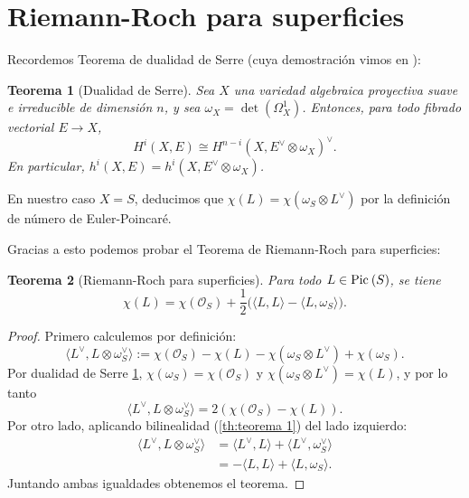 \documentclass[spanish,12pt]{amsart}
\newcommand{\Pic}[1]{\textup{Pic}{ \: (#1)}}
\newtheorem{theorem}{Teorema}[section]
\theoremstyle{definition}
\theoremstyle{remark}
\numberwithin{equation}{section}
\renewcommand{\O}{\mathcal{O}}
\begin{document}
\section{Riemann-Roch para superficies}

Recordemos Teorema de dualidad de Serre (cuya demostración vimos en \cite[Teorema 5.1.3]{notas_pedro}):

\begin{theorem}[Dualidad de Serre]\label{th:dualidad de serre}
Sea $X$ una variedad algebraica proyectiva suave e irreducible de dimensión $n$, y sea $\omega_X = \det (\Omega_X^1)$. Entonces, para todo fibrado vectorial $E \to X$,
\[
    H^i (X, E) \cong H^{n-i} (X, E^\vee \otimes \omega_X)^{\vee}.
\]
En particular, $h^i (X, E) = h^i (X, E^\vee \otimes \omega_X)$.
\end{theorem}
En nuestro caso $X = S$, deducimos que $\chi (L) = \chi (\omega_S \otimes L^\vee)$ por la definición de número de Euler-Poincaré.

Gracias a esto podemos probar el Teorema de Riemann-Roch para superficies:

\begin{theorem}[Riemann-Roch para superficies]\label{th:riemann-roch para superficies}
Para todo $L \in \Pic S$, se tiene
\[
    \chi (L) = \chi (\O_S) + \frac 1 2 \big ( \langle L, L\rangle  - \langle L, \omega_S\rangle  \big ).
\]
\end{theorem}
\begin{proof}
Primero calculemos por definición:
\[
    \langle L^\vee, L \otimes \omega_S^\vee \rangle  := \chi (\O_S) - \chi (L) - \chi (\omega_S \otimes L^\vee) + \chi (\omega_S).
\]
Por dualidad de Serre \ref{th:dualidad de serre}, $\chi (\omega_S) = \chi (\O_S)$ y $\chi (\omega_S \otimes L ^\vee) = \chi (L)$, y por lo tanto
\[
    \langle L^\vee, L \otimes \omega_S^\vee \rangle = 2 \left ( \chi (\O_S) - \chi (L) \right).
\]
Por otro lado, aplicando bilinealidad (\ref{th:teorema 1}) del lado izquierdo:
\begin{align*}
\langle L^\vee, L \otimes \omega_S^\vee \rangle  &= \langle L^\vee, L\rangle + \langle L^\vee, \omega_S^\vee \rangle \\
&= - \langle L , L\rangle  + \langle L, \omega_S\rangle.
\end{align*}
Juntando ambas igualdades obtenemos el teorema.
\end{proof}
\end{document}
